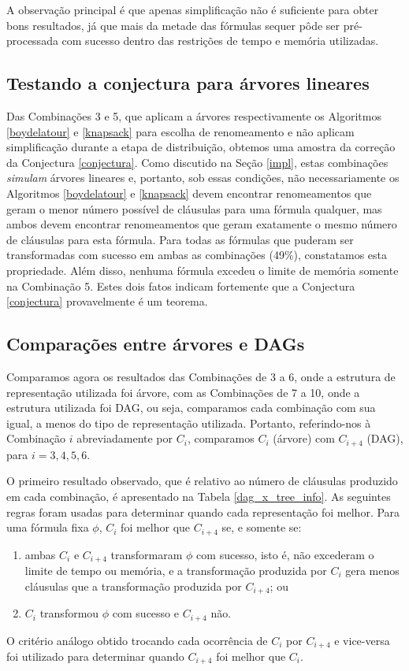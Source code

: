 A observação principal é que apenas simplificação não é suficiente para obter bons resultados, já que mais da metade das fórmulas sequer pôde ser pré-processada com sucesso dentro das restrições de tempo e memória utilizadas.

\subsection{Testando a conjectura para árvores lineares}

\indent

Das Combinações 3 e 5, que aplicam a árvores respectivamente os Algoritmos \ref{boydelatour} e \ref{knapsack} para escolha de renomeamento e não aplicam simplificação durante a etapa de distribuição, obtemos uma amostra da correção da Conjectura \ref{conjectura}. Como discutido na Seção \ref{impl}, estas combinações \emph{simulam} árvores lineares e, portanto, sob essas condições, não necessariamente os Algoritmos \ref{boydelatour} e \ref{knapsack} devem encontrar renomeamentos que geram o menor número possível de cláusulas para uma fórmula qualquer, mas ambos devem encontrar renomeamentos que geram exatamente o mesmo número de cláusulas para esta fórmula. Para todas as fórmulas que puderam ser transformadas com sucesso em ambas as combinações (49\%), constatamos esta propriedade. Além disso, nenhuma fórmula excedeu o limite de memória somente na Combinação 5. Estes dois fatos indicam fortemente que a Conjectura \ref{conjectura} provavelmente é um teorema.

\subsection{Comparações entre árvores e DAGs}

\indent

Comparamos agora os resultados das Combinações de 3 a 6, onde a estrutura de representação utilizada foi árvore, com as Combinações de 7 a 10, onde a estrutura utilizada foi DAG, ou seja, comparamos cada combinação com sua igual, a menos do tipo de representação utilizada. Portanto, referindo-nos à Combinação $i$ abreviadamente por $C_i$, comparamos $C_i$ (árvore) com $C_{i+4}$ (DAG), para $i=3,4,5,6$.

O primeiro resultado observado, que é relativo ao número de cláusulas produzido em cada combinação, é apresentado na Tabela \ref{dag_x_tree_info}. As seguintes regras foram usadas para determinar quando cada representação foi melhor. Para uma fórmula fixa $\phi$, $C_i$ foi melhor que $C_{i+4}$ se, e somente se:
\begin{enumerate}
	\item ambas $C_i$ e $C_{i+4}$ transformaram $\phi$ com sucesso, isto é, não excederam o limite de tempo ou memória, e a transformação produzida por $C_i$ gera menos cláusulas que a transformação produzida por $C_{i+4}$; ou
	\item $C_i$ transformou $\phi$ com sucesso e $C_{i+4}$ não.
\end{enumerate}
O critério análogo obtido trocando cada ocorrência de $C_i$ por $C_{i+4}$ e vice-versa foi utilizado para determinar quando $C_{i+4}$ foi melhor que $C_i$.

